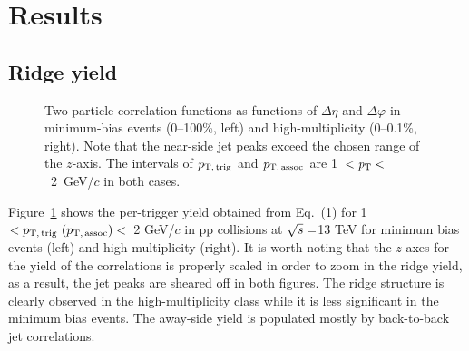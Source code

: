 
\section {Results}
\label{sec:results}

\subsection{Ridge yield}
\label{sec:resultunbiased}
\begin{figure}[b!]
	\centering
	\caption{ Two-particle correlation functions as functions of $\Delta\eta$ and $\Delta\varphi$ in minimum-bias events (0--100\%, left) and high-multiplicity (0--0.1\%, right). Note that the near-side jet peaks exceed the chosen range of the $z$-axis. The intervals of $p_\mathrm{T,\,trig}$ and $p_\mathrm{T,\,assoc}$ are 1~$<\it{p}_{\rm{T}}<$~2~GeV/$c$ in both cases.}
	\label{fig:PlotCorrMBHMT}
\end{figure}

Figure~\ref{fig:PlotCorrMBHMT} shows the per-trigger yield obtained from Eq.~(1) for 1~$<p_\mathrm{T,\,trig}~\mathrm (p_\mathrm{T,\,assoc})<$~2 GeV/$c$ in pp collisions at $\sqrt{\it{s}} = $\unit{13} {\rm{}TeV} for minimum bias events (left) and high-multiplicity (right). It is worth noting that the $z$-axes for the yield of the correlations is properly scaled in order to zoom in the ridge yield, as a result, the jet peaks are sheared off in both figures. The ridge structure is clearly observed in the high-multiplicity class while it is less significant in the minimum bias events. The away-side yield is populated mostly by back-to-back jet correlations.

